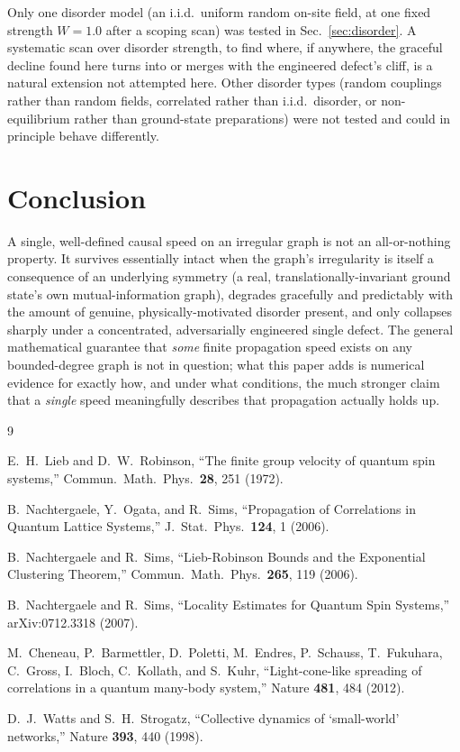 \documentclass[11pt]{article}
\begin{document}
Only one disorder model (an i.i.d.\ uniform random on-site field, at one fixed strength $W=1.0$ after a scoping scan) was tested in Sec.~\ref{sec:disorder}. A systematic scan over disorder strength, to find where, if anywhere, the graceful decline found here turns into or merges with the engineered defect's cliff, is a natural extension not attempted here. Other disorder types (random couplings rather than random fields, correlated rather than i.i.d.\ disorder, or non-equilibrium rather than ground-state preparations) were not tested and could in principle behave differently.

\section{Conclusion}
\label{sec:conclusion}

A single, well-defined causal speed on an irregular graph is not an all-or-nothing property. It survives essentially intact when the graph's irregularity is itself a consequence of an underlying symmetry (a real, translationally-invariant ground state's own mutual-information graph), degrades gracefully and predictably with the amount of genuine, physically-motivated disorder present, and only collapses sharply under a concentrated, adversarially engineered single defect. The general mathematical guarantee that \emph{some} finite propagation speed exists on any bounded-degree graph is not in question; what this paper adds is numerical evidence for exactly how, and under what conditions, the much stronger claim that a \emph{single} speed meaningfully describes that propagation actually holds up.

\begin{thebibliography}{9}

E.~H.~Lieb and D.~W.~Robinson, ``The finite group velocity of quantum spin systems,'' Commun.\ Math.\ Phys.\ \textbf{28}, 251 (1972).

B.~Nachtergaele, Y.~Ogata, and R.~Sims, ``Propagation of Correlations in Quantum Lattice Systems,'' J.\ Stat.\ Phys.\ \textbf{124}, 1 (2006).

B.~Nachtergaele and R.~Sims, ``Lieb-Robinson Bounds and the Exponential Clustering Theorem,'' Commun.\ Math.\ Phys.\ \textbf{265}, 119 (2006).

B.~Nachtergaele and R.~Sims, ``Locality Estimates for Quantum Spin Systems,'' arXiv:0712.3318 (2007).

M.~Cheneau, P.~Barmettler, D.~Poletti, M.~Endres, P.~Schauss, T.~Fukuhara, C.~Gross, I.~Bloch, C.~Kollath, and S.~Kuhr, ``Light-cone-like spreading of correlations in a quantum many-body system,'' Nature \textbf{481}, 484 (2012).

D.~J.~Watts and S.~H.~Strogatz, ``Collective dynamics of `small-world' networks,'' Nature \textbf{393}, 440 (1998).

\end{thebibliography}
\end{document}
